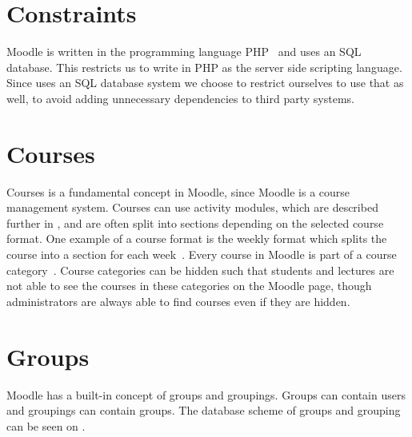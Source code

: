 \section{Constraints}
\label{sub:constraints}
Moodle is written in the programming language PHP~\cite{moodleabout} and uses an SQL database.
This restricts us to write \system{} in PHP as the server side scripting language.
Since \moodle{} uses an SQL database system we choose to restrict ourselves to use that as well, to avoid adding unnecessary dependencies to third party systems.


\section{Courses}
\label{sub:courses}
Courses is a fundamental concept in Moodle, since Moodle is a course management system.
Courses can use activity modules, which are described further in , and are often split into sections depending on the selected course format.
One example of a course format is the weekly format which splits the course into a section for each week~\cite{moodlecourseformat}.
Every course in Moodle is part of a course category~\cite{moodlecoursecategories}. 
Course categories can be hidden such that students and lectures are not able to see the courses in these categories on the Moodle page, though administrators are always able to find courses even if they are hidden.


\section{Groups}
\label{sec:groups}
Moodle has a built-in concept of groups and groupings. 
Groups can contain users and groupings can contain groups. 
The database scheme of groups and grouping can be seen on .

